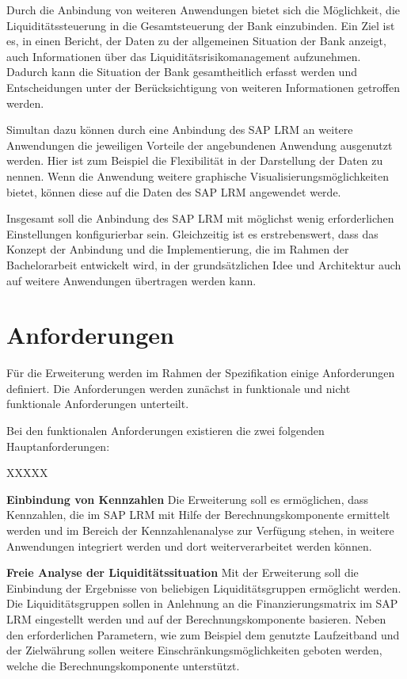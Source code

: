 Durch die Anbindung von weiteren Anwendungen bietet sich die Möglichkeit, die  Liquiditätssteuerung in die Gesamtsteuerung der Bank einzubinden. Ein Ziel ist es, in einen Bericht, der Daten zu der allgemeinen Situation der Bank anzeigt, auch Informationen über das Liquiditätsrisikomanagement aufzunehmen. Dadurch kann die Situation der Bank gesamtheitlich erfasst werden und Entscheidungen unter der Berücksichtigung von weiteren Informationen getroffen werden.

Simultan dazu können durch eine Anbindung des SAP LRM an weitere Anwendungen die jeweiligen Vorteile der angebundenen Anwendung ausgenutzt werden. Hier ist zum Beispiel die Flexibilität in der Darstellung der Daten zu nennen. Wenn die Anwendung weitere graphische Visualisierungsmöglichkeiten bietet, können diese auf die Daten des SAP LRM angewendet werde.

Insgesamt soll die Anbindung des SAP LRM mit möglichst wenig erforderlichen Einstellungen konfigurierbar sein. Gleichzeitig ist es erstrebenswert, dass das Konzept der Anbindung und die Implementierung, die im Rahmen der Bachelorarbeit entwickelt wird, in der grundsätzlichen Idee und Architektur auch auf weitere Anwendungen übertragen werden kann.

\section{Anforderungen}

Für die Erweiterung werden im Rahmen der Spezifikation einige Anforderungen definiert. Die Anforderungen werden zunächst in funktionale und nicht funktionale Anforderungen unterteilt. 

Bei den funktionalen Anforderungen existieren die zwei folgenden Hauptanforderungen:

\begin{seToplist}{ XXXXX }

\item[\anfl{kpi}] \textbf{Einbindung von Kennzahlen} \newline
Die Erweiterung soll es ermöglichen, dass Kennzahlen, die im SAP LRM  mit Hilfe der Berechnungskomponente ermittelt werden und im Bereich der Kennzahlenanalyse zur Verfügung stehen, in weitere Anwendungen integriert werden und dort weiterverarbeitet werden können.

\item[\anfl{fundingMatrix}] \textbf{Freie Analyse der Liquiditätssituation} \newline
Mit der Erweiterung soll die Einbindung der Ergebnisse von beliebigen Liquiditätsgruppen ermöglicht werden. Die Liquiditätsgruppen sollen in Anlehnung an die Finanzierungsmatrix im SAP LRM eingestellt werden und auf der Berechnungskomponente basieren. Neben den erforderlichen Parametern, wie zum Beispiel dem genutzte Laufzeitband und der Zielwährung sollen weitere Einschränkungsmöglichkeiten geboten werden, welche die Berechnungskomponente unterstützt.

\end{seToplist}

